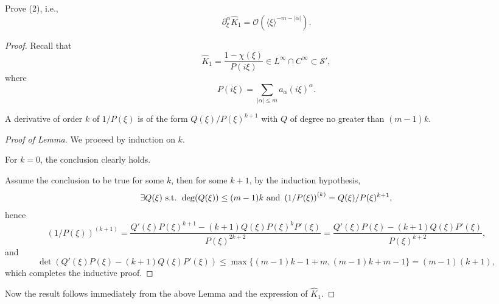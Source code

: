 \begin{pro}
  Prove (2), i.e.,
  \begin{displaymath}
    \partial_{\xi}^{\alpha}\hat{K}_1 = \mathcal{O}(\langle\xi\rangle^{-m-|\alpha|}).
  \end{displaymath}
\end{pro}
\begin{proof}
  Recall that
  \begin{displaymath}
   \hat{K}_1 = \frac{1-\chi(\xi)}{P(i\xi)}\in L^{\infty}\cap C^{\infty} \subset \mathcal{S}',
 \end{displaymath}
 where
 \begin{displaymath}
   P(i\xi) = \sum_{|\alpha|\le m}a_{\alpha}(i\xi)^{\alpha}.
 \end{displaymath}
 \begin{lem}
   A derivative of order $k$ of $1/P(\xi)$ is of the form $Q(\xi)/P(\xi)^{k+1}$
   with $Q$ of degree no greater than $(m-1)k$.
 \end{lem}
 \begin{proof}[Proof of Lemma]
   We proceed by induction on $k$.

   For $k=0$, the conclusion clearly holds.

   Assume the conclusion to be true for some $k$,
   then for some $k+1$,
   by the induction hypothesis,
   \begin{displaymath}
     \exists Q(\xi) \text{ s.t. } \deg(Q(\xi))\le (m-1)k \text{ and } \left( 1/P(\xi)\right)^{(k)}
     = Q(\xi)/P(\xi)^{k+1},
   \end{displaymath}
   hence
   \begin{displaymath}
     (1/P(\xi))^{(k+1)} = \frac{Q'(\xi)P(\xi)^{k+1}-(k+1)Q(\xi)P(\xi)^kP'(\xi)}{P(\xi)^{2k+2}}
     = \frac{Q'(\xi)P(\xi)-(k+1)Q(\xi)P'(\xi)}{P(\xi)^{k+2}},
   \end{displaymath}
   and
   \begin{displaymath}
     \det(Q'(\xi)P(\xi)-(k+1)Q(\xi)P'(\xi)) \leq \max\{(m-1)k-1+m, (m-1)k+m-1\} = (m-1)(k+1),
   \end{displaymath}
   which completes the inductive proof.
 \end{proof}

 Now the result follows immediately from the above Lemma
 and the expression of $\hat{K}_1$.
\end{proof}
